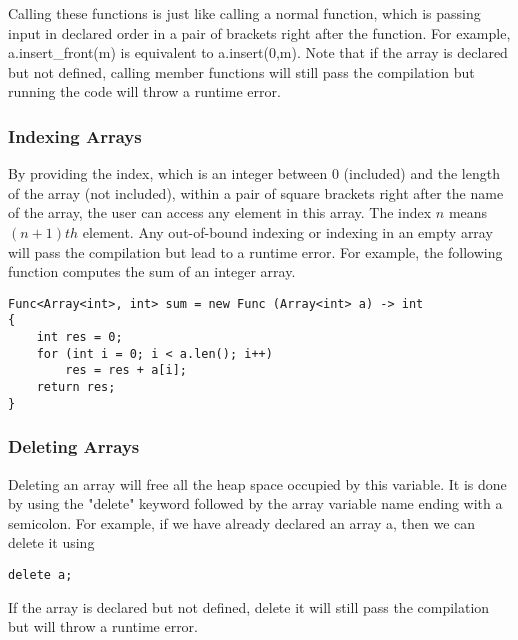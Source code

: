 \par Calling these functions is just like calling a normal function, which is passing input in declared order in a pair of brackets right after the function. For example, a.insert\_front(m) is equivalent to a.insert(0,m). Note that if the array is declared but not defined, calling member functions will still pass the compilation but running the code will throw a runtime error.

\subsubsection{Indexing Arrays}
\par By providing the index, which is an integer between 0 (included) and the length of the array (not included), within a pair of square brackets right after the name of the array, the user can access any element in this array. The index $n$ means $(n+1)th$ element. Any out-of-bound indexing or indexing in an empty array will pass the compilation but lead to a runtime error. For example, the following function computes the sum of an integer array.
\begin{lstlisting}[caption={array\_sum.csm}, captionpos=b]
Func<Array<int>, int> sum = new Func (Array<int> a) -> int 
{
    int res = 0;
    for (int i = 0; i < a.len(); i++)
        res = res + a[i];
    return res;
}

\end{lstlisting}

\subsubsection{Deleting Arrays}
Deleting an array will free all the heap space occupied by this variable. It is done by using the "delete" keyword followed by the array variable name ending with a semicolon. For example, if we have already declared an array a, then we can delete it using
\begin{lstlisting}[caption={array\_delete.csm}, captionpos=b]
delete a;

\end{lstlisting}
If the array is declared but not defined, delete it will still pass the compilation but will throw a runtime error.

